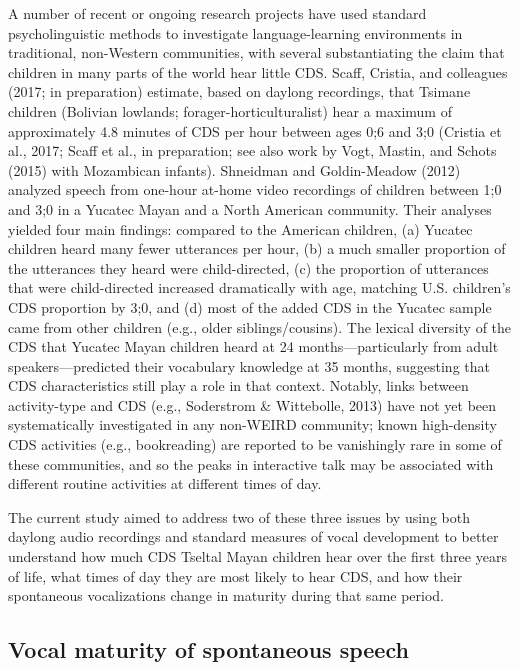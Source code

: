 \documentclass[floatsintext,man]{apa6}
\theoremstyle{definition}
\theoremstyle{definition}
\theoremstyle{definition}
\theoremstyle{remark}
\begin{document}
A number of recent or ongoing research projects have used standard
psycholinguistic methods to investigate language-learning environments
in traditional, non-Western communities, with several substantiating the
claim that children in many parts of the world hear little CDS. Scaff,
Cristia, and colleagues (2017; in preparation) estimate, based on
daylong recordings, that Tsimane children (Bolivian lowlands;
forager-horticulturalist) hear a maximum of approximately 4.8 minutes of
CDS per hour between ages 0;6 and 3;0 (Cristia et al., 2017; Scaff et
al., in preparation; see also work by Vogt, Mastin, and Schots (2015)
with Mozambican infants). Shneidman and Goldin-Meadow (2012) analyzed
speech from one-hour at-home video recordings of children between 1;0
and 3;0 in a Yucatec Mayan and a North American community. Their
analyses yielded four main findings: compared to the American children,
(a) Yucatec children heard many fewer utterances per hour, (b) a much
smaller proportion of the utterances they heard were child-directed, (c)
the proportion of utterances that were child-directed increased
dramatically with age, matching U.S. children's CDS proportion by 3;0,
and (d) most of the added CDS in the Yucatec sample came from other
children (e.g., older siblings/cousins). The lexical diversity of the
CDS that Yucatec Mayan children heard at 24 months---particularly from
adult speakers---predicted their vocabulary knowledge at 35 months,
suggesting that CDS characteristics still play a role in that context.
Notably, links between activity-type and CDS (e.g., Soderstrom \&
Wittebolle, 2013) have not yet been systematically investigated in any
non-WEIRD community; known high-density CDS activities (e.g.,
bookreading) are reported to be vanishingly rare in some of these
communities, and so the peaks in interactive talk may be associated with
different routine activities at different times of day.

The current study aimed to address two of these three issues by using
both daylong audio recordings and standard measures of vocal development
to better understand how much CDS Tseltal Mayan children hear over the
first three years of life, what times of day they are most likely to
hear CDS, and how their spontaneous vocalizations change in maturity
during that same period.

\subsection{Vocal maturity of spontaneous
speech}\label{vocal-maturity-of-spontaneous-speech}
\end{document}
